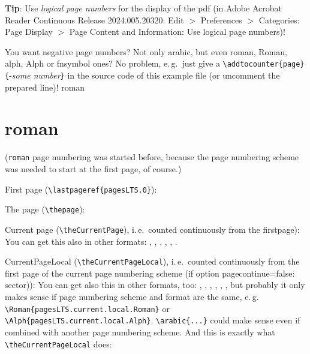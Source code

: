 \documentclass[british]{article}[2024/06/29]%
\begin{document}
\textbf{Tip}: Use \textit{logical page numbers} for the display of the pdf
(in Adobe Acrobat Reader Continuous Release 2024.005.20320:\newline
Edit $>$ Preferences $>$ Categories: Page Display $>$
Page Content and Information: Use logical page numbers)!\bigskip

You want negative page numbers? Not only arabic, but even roman,
Roman, alph, Alph or fnsymbol ones? No problem, e.\,g.~just give a\newline
\verb|\addtocounter{page}{|-\textit{some number}\verb|}| in the
source code of this example file (or uncomment the prepared line)!
\newpage
\tableofcontents
\newpage%
\makeatletter%
\def\pagesLTS@tmpC{roman}%
\ifx\pagesLTS@pnc\pagesLTS@tmpC%
\else{}%
\fi%
\makeatother%
\section{roman}

(\texttt{roman} page numbering was started before,
because the page numbering scheme was needed to start at
the first page, of course.)\bigskip

First page (\verb|\lastpageref{pagesLTS.0}|):
\bigskip

The page (\verb|\thepage|): \thepage \bigskip

Current page (\verb|\theCurrentPage|),
i.\,e.~counted continuously from the first\linebreak page):~\theCurrentPage \bigskip
You can get this also in other formats:
, , ,
, , .

CurrentPageLocal (\verb|\theCurrentPageLocal|),
i.\,e.~counted continuously from the first page of the
current page numbering scheme (if option pagecontinue=false: sector)):
\theCurrentPageLocal\newline
You can get also this in other formats, too:
, ,
, ,
, ,
but probably it only makes sense if page numbering scheme and format are
the same, e.\,g.\newline
\verb|\Roman{pagesLTS.current.local.Roman}|\newline
or \verb|\Alph{pagesLTS.current.local.Alph}|. \verb|\arabic{...}| could
make sense even if combined with another page numbering scheme.
And this is exactly what \verb|\theCurrentPageLocal| does:\newline
{}\bigskip
\end{document}
